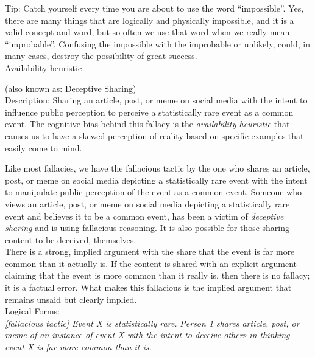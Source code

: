 \documentclass[a4paper,12pt,single,pdftex]{scrbook}
\begin{document}
    
      Tip: Catch yourself every time you are about to use the word “impossible”.  Yes, there are many things that are logically and physically impossible, and it is a valid concept and word, but so often we use that word when we really mean  “improbable”.  Confusing the impossible with the improbable or unlikely, could, in many cases, destroy the possibility of great success.
    \\

  

Availability heuristic
    
      (also known as: Deceptive Sharing)
    \\

  
    Description: Sharing an article, post, or meme on social media with the intent to influence public perception to perceive a statistically rare event as a common event. The cognitive bias behind this fallacy is the {\em availability heuristic} that causes us to have a skewed perception of reality based on specific examples that easily come to mind.

    
      Like most fallacies, we have the fallacious tactic by the one who shares an article, post, or meme on social media depicting a statistically rare event with the intent to manipulate public perception of the event as a common event. Someone who views an article, post, or meme on social media depicting a statistically rare event and believes it to be a common event, has been a victim of {\em deceptive sharing} and is using fallacious reasoning. It is also possible for those sharing content to be deceived, themselves.
    \\

    
      There is a strong, implied argument with the share that the event is far more common than it actually is. If the content is shared with an explicit argument claiming that the event is more common than it really is, then there is no fallacy; it is a factual error. What makes this fallacious is the implied argument that remains unsaid but clearly implied.
    \\

    
      Logical Forms:
    \\

    
      {\em [fallacious tactic]} \newline
{\em Event X is statistically rare.} \newline
{\em Person 1 shares article, post, or meme of an instance of event X with the intent to deceive others in thinking event X is far more common than it is.}
    \\
\end{document}
